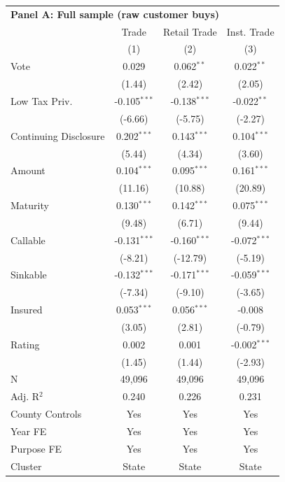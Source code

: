 \begingroup
\centering
\begin{tabular*}{\textwidth}{@{\extracolsep{\fill}}lccc}
\multicolumn{5}{l}{\textbf{Panel A: Full sample (raw customer buys)}}\\

\addlinespace
   \toprule
                         & Trade          & Retail Trade   & Inst. Trade\\  
                         & (1)            & (2)            & (3)\\  
   \midrule 
   Vote                  & 0.029          & 0.062$^{**}$   & 0.022$^{**}$\\   
                         & (1.44)        & (2.42)        & (2.05)\\   
   Low Tax Priv.         & -0.105$^{***}$ & -0.138$^{***}$ & -0.022$^{**}$\\   
                         & (-6.66)       & (-5.75)       & (-2.27)\\   
   Continuing Disclosure & 0.202$^{***}$  & 0.143$^{***}$  & 0.104$^{***}$\\   
                         & (5.44)        & (4.34)        & (3.60)\\   
   Amount                & 0.104$^{***}$  & 0.095$^{***}$  & 0.161$^{***}$\\   
                         & (11.16)       & (10.88)       & (20.89)\\   
   Maturity              & 0.130$^{***}$  & 0.142$^{***}$  & 0.075$^{***}$\\   
                         & (9.48)        & (6.71)        & (9.44)\\   
   Callable              & -0.131$^{***}$ & -0.160$^{***}$ & -0.072$^{***}$\\   
                         & (-8.21)       & (-12.79)      & (-5.19)\\   
   Sinkable              & -0.132$^{***}$ & -0.171$^{***}$ & -0.059$^{***}$\\   
                         & (-7.34)       & (-9.10)       & (-3.65)\\   
   Insured               & 0.053$^{***}$  & 0.056$^{***}$  & -0.008\\   
                         & (3.05)        & (2.81)        & (-0.79)\\   
   Rating                & 0.002          & 0.001          & -0.002$^{***}$\\   
                         & (1.45)        & (1.44)        & (-2.93)\\   
   \hline
   N          & 49,096         & 49,096         & 49,096\\  
   Adj. R$^2$        & 0.240          & 0.226          & 0.231\\  
   County Controls       & Yes            & Yes            & Yes\\  
   Year FE               & Yes            & Yes            & Yes\\  
   Purpose FE            & Yes            & Yes            & Yes\\  
   Cluster              & State & State & State\\  
   \bottomrule
\end{tabular*}
\par\endgroup

